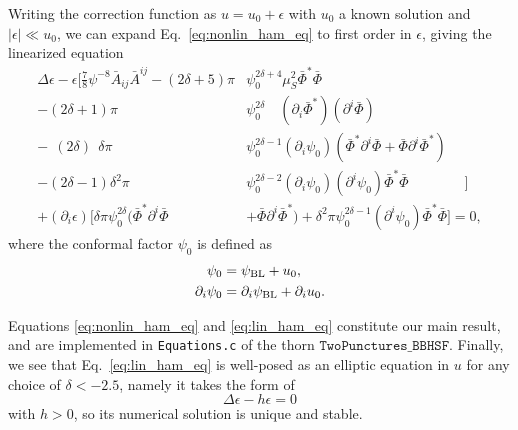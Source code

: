 Writing the correction function as $u = u_0 + \epsilon$ with $u_0$ a known solution
and $|\epsilon|\ll u_0$, 
we can expand Eq.~\eqref{eq:nonlin_ham_eq} to first order in $\epsilon$, giving
the linearized equation
\begin{align}
    \Delta\epsilon
    - \epsilon
    \Bigg[
        \frac{7}{8} \psi^{-8} \bar{A}_{ij} \bar{A}^{ij}
        - (2\delta + 5) \pi
        &\psi_0^{2\delta + 4}
        \mu_S^2 \bar{\Phi}^* \bar{\Phi}
        \nonumber
        \\
        - (2\delta + 1) \pi
        &\psi_0^{2\delta}\quad
        (\partial_i\bar{\Phi}^*)
        (\partial^i\bar{\Phi})
        \nonumber
        \\
        -\ \ (2\delta)\ \ \delta \pi
        &\psi_0^{2\delta-1} (\partial_i\psi_0)
        ( \bar{\Phi}^* \partial^i\bar{\Phi}
        + \bar{\Phi} \partial^i\bar{\Phi}^* )
        \nonumber
        \\
        - (2\delta-1) \delta^2 \pi
        &\psi_0^{2\delta-2}
        (\partial_i\psi_0) (\partial^i\psi_0)
        \bar{\Phi}^* \bar{\Phi}
    \quad\quad\quad\quad\Big]
    \nonumber
    \\
    + (\partial_i\epsilon)
    \Big[
        \delta \pi \psi_0^{2\delta}
        ( \bar{\Phi}^* \partial^i\bar{\Phi}
        &+ \bar{\Phi} \partial^i\bar{\Phi}^* )
        +
        \delta^2 \pi \psi_0^{2\delta-1} (\partial^i\psi_0)
        \bar{\Phi}^* \bar{\Phi}
    \Big]= 0,
    \label{eq:lin_ham_eq}
\end{align}
where the conformal factor $\psi_0$ is defined as
\begin{align}
    \psi_0
    &= \psi_{\rm BL} + u_0,
    \\
    \partial_i \psi_0
    &= \partial_i \psi_{\rm BL}
    + \partial_i u_0.
\end{align}

Equations \eqref{eq:nonlin_ham_eq} and \eqref{eq:lin_ham_eq} constitute our main result,
and are implemented in \texttt{Equations.c} of the thorn $\texttt{TwoPunctures\_BBHSF}$.
Finally, we see that Eq.~\eqref{eq:lin_ham_eq} is well-posed as an elliptic equation in $u$
for any choice of $\delta < -2.5$,
namely it takes the form of 
\begin{equation}
    \Delta \epsilon - h \epsilon = 0
\end{equation}
with $h>0$,
so its numerical solution is unique and stable.

